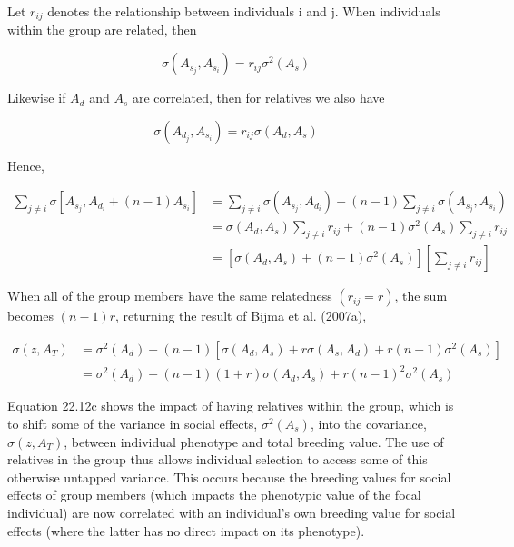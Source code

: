 \documentclass{article}
\begin{document}
Let  $ r_{ij} $ denotes the relationship between individuals i and j. When individuals within the group are related, then

\begin{equation}
\sigma(A_{s_{j}},A_{s_{i}})=r_{ij}\sigma^{2}(A_{s})
\end{equation}

Likewise if  $ A_{d} $ and  $ A_{s} $ are correlated, then for relatives we also have

\begin{equation}
\sigma(A_{d_{j}},A_{s_{i}})=r_{ij}\sigma(A_{d},A_{s})
\end{equation}

Hence,

\begin{equation}
\begin{align*}\sum_{j\neq i}\sigma\left[A_{s_{j}},A_{d_{i}}+(n-1)A_{s_{i}}\right]&=\sum_{j\neq i}\sigma\left(A_{s_{j}},A_{d_{i}}\right)+(n-1)\sum_{j\neq i}\sigma\left(A_{s_{j}},A_{s_{i}}\right)\\&=\sigma(A_{d},A_{s})\sum_{j\neq i}r_{ij}+(n-1)\sigma^{2}(A_{s})\sum_{j\neq i}r_{ij}\\&=\left[\sigma(A_{d},A_{s})+(n-1)\sigma^{2}(A_{s})\right]\left[\sum_{j\neq i}r_{ij}\right]\end{align*}
\tag{22.12a}
\label{eq:22_12a}
\end{equation}

When all of the group members have the same relatedness  $ (r_{ij} = r) $, the sum becomes  $ (n - 1)r $, returning the result of Bijma et al. (2007a),

\begin{equation}
\begin{aligned}\sigma(z,A_{T})&=\sigma^{2}(A_{d})+(n-1)\left[\sigma(A_{d},A_{s})+r\sigma\left(A_{s},A_{d}\right)+r(n-1)\sigma^{2}\left(A_{s}\right)\right]\\&=\sigma^{2}(A_{d})+(n-1)(1+r)\sigma(A_{d},A_{s})+r(n-1)^{2}\sigma^{2}\left(A_{s}\right)\end{aligned}
\tag{22.12b}
\label{eq:22_12b}
\end{equation}

Equation 22.12c shows the impact of having relatives within the group, which is to shift some of the variance in social effects,  $ \sigma^2(A_s) $, into the covariance,  $ \sigma(z, A_T) $, between individual phenotype and total breeding value. The use of relatives in the group thus allows individual selection to access some of this otherwise untapped variance. This occurs because the breeding values for social effects of group members (which impacts the phenotypic value of the focal individual) are now correlated with an individual's own breeding value for social effects (where the latter has no direct impact on its phenotype).
\end{document}
